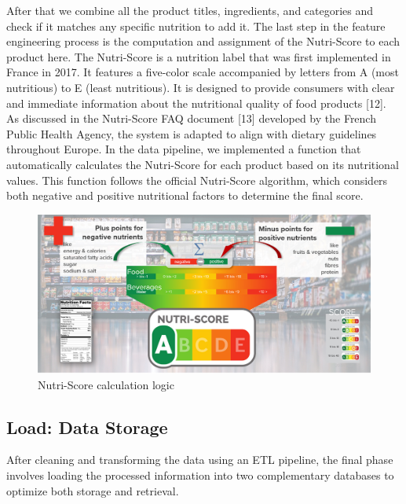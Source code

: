 After that we combine all the product titles, ingredients, and categories
and check if it matches any specific nutrition to add it. The last step in the
feature engineering process is the computation and assignment of the
Nutri-Score to each product here.
The Nutri-Score is a nutrition label that was first implemented in France
in 2017. It features a five-color scale accompanied by letters from A (most
nutritious) to E (least nutritious). It is designed to provide consumers
with clear and immediate information about the nutritional quality of
food products [12]. As discussed in the Nutri-Score FAQ document [13]
developed by the French Public Health Agency, the system is adapted to
align with dietary guidelines throughout Europe. In the data pipeline,
we implemented a function that automatically calculates the Nutri-Score
for each product based on its nutritional values. This function follows
the official Nutri-Score algorithm, which considers both negative and
positive nutritional factors to determine the final score.



\begin{center}
\begin{figure}[H]
    \includegraphics[scale=0.75]{images/nutriscore.jpg}
    \caption{Nutri-Score calculation logic} 
    \label{fig: add_nutriscore}
\end{figure}
\end{center}

\subsection{Load: Data Storage}
After cleaning and transforming the data using an ETL pipeline, the final
phase involves loading the processed information into two complementary
databases to optimize both storage and retrieval.

